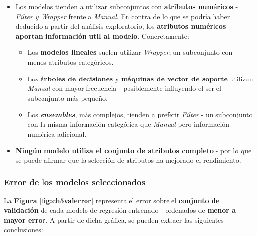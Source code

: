 \begin{itemize}[leftmargin=*, parsep=1pt, itemsep=2pt, topsep=1pt]
	\item Los modelos tienden a utilizar subconjuntos con \textbf{atributos numéricos} - \textit{Filter y Wrapper} frente a \textit{Manual}. En contra de lo que se podría haber deducido a partir del análisis exploratorio, los \textbf{atributos numéricos aportan información util al modelo}. Concretamente:
	\begin{itemize}[parsep=1pt, itemsep=2pt, topsep=1pt]
		\item Los \textbf{modelos lineales} suelen utilizar \textit{Wrapper}, un subconjunto con menos atributos categóricos.
		\item Los \textbf{árboles de decisiones} y \textbf{máquinas de vector de soporte} utilizan \textit{Manual} con mayor frecuencia - posiblemente influyendo el ser el subconjunto más pequeño.
		\item Los \textit{\textbf{ensembles}}, más complejos, tienden a preferir \textit{Filter} - un subconjunto con la misma información categórica que \textit{Manual} pero información numérica adicional.
	\end{itemize}
	\item \textbf{Ningún modelo utiliza el conjunto de atributos completo} - por lo que se puede afirmar que la selección de atributos ha mejorado el rendimiento.
\end{itemize}

\subsubsection{Error de los modelos seleccionados}

La \textbf{Figura \ref{fig:ch5valerror}} representa el error sobre el \textbf{conjunto de validación} de cada modelo de regresión entrenado - ordenados de \textbf{menor a mayor error}. A partir de dicha gráfica, se pueden extraer las siguientes conclusiones:

